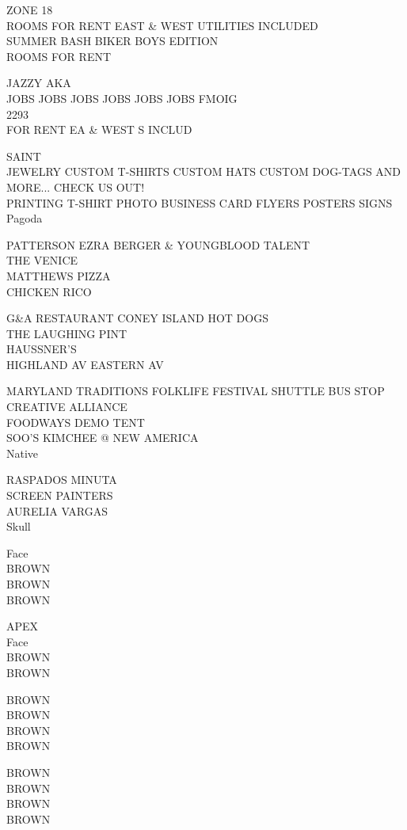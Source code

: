 \documentclass[10pt,letterpaper]{article}
\begin{document}
ZONE 18\\
ROOMS FOR RENT EAST \& WEST UTILITIES INCLUDED\\
SUMMER BASH BIKER BOYS EDITION\\
ROOMS FOR RENT

JAZZY AKA\\
JOBS JOBS JOBS JOBS JOBS JOBS FMOIG\\
2293\\
FOR RENT EA \& WEST S INCLUD

SAINT\\
JEWELRY CUSTOM T{-}SHIRTS CUSTOM HATS CUSTOM DOG{-}TAGS AND MORE... CHECK US OUT!\\
PRINTING T{-}SHIRT PHOTO BUSINESS CARD FLYERS POSTERS SIGNS\\
Pagoda

PATTERSON EZRA BERGER \& YOUNGBLOOD TALENT\\
THE VENICE\\
MATTHEWS PIZZA\\
CHICKEN RICO

G\&A RESTAURANT CONEY ISLAND HOT DOGS\\
THE LAUGHING PINT\\
HAUSSNER'S\\
HIGHLAND AV EASTERN AV

MARYLAND TRADITIONS FOLKLIFE FESTIVAL SHUTTLE BUS STOP CREATIVE ALLIANCE\\
FOODWAYS DEMO TENT\\
SOO'S KIMCHEE @ NEW AMERICA\\
Native

RASPADOS MINUTA\\
SCREEN PAINTERS\\
AURELIA VARGAS\\
Skull

Face\\
BROWN\\
BROWN\\
BROWN

APEX\\
Face\\
BROWN\\
BROWN

BROWN\\
BROWN\\
BROWN\\
BROWN

BROWN\\
BROWN\\
BROWN\\
BROWN
\end{document}
